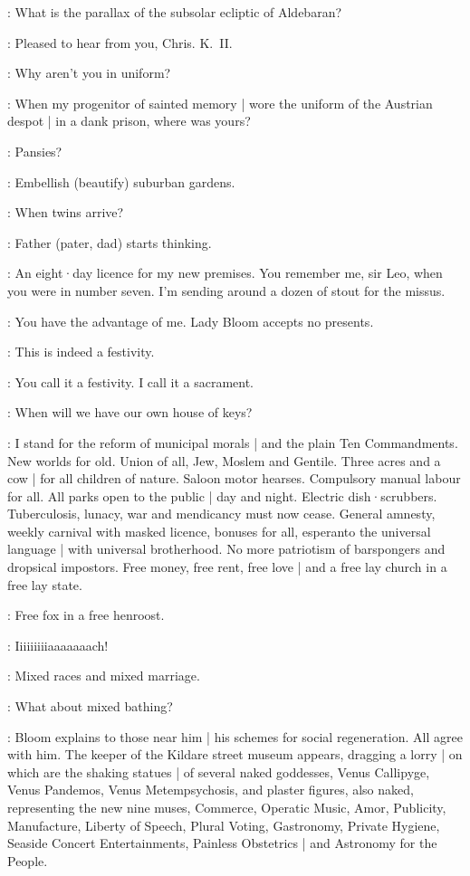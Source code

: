 
\ChrisCallinan[1]:
What is the parallax of the subsolar ecliptic of Aldebaran?

\Bloom:
Pleased to hear from you,
Chris.
K.~II.

\JoeHynes[2]:
Why aren't you in uniform?%

\Bloom:
When my progenitor of sainted memory |
wore the uniform of the Austrian despot |
in a dank prison,
where was yours?

\BenDollard[1]:
Pansies?

\Bloom:
Embellish (beautify) suburban gardens.

\BenDollard:
When twins arrive?

\Bloom:
Father (pater, dad) starts thinking.

\LarryORourke[2]:
An eight·day licence for my new premises.
You remember me,
sir Leo,
when you were in number seven.
I'm sending around a dozen of stout for the missus.

\Bloom:
You have the advantage of me.
Lady Bloom accepts no presents.

\Crofton[1]:
This is indeed a festivity.

\Bloom:
You call it a festivity.
I call it a sacrament.

\AlexanderKeyes[2]:
When will we have our own house of keys?

\Bloom:
I stand for the reform of municipal morals |
and the plain Ten Commandments.
New worlds for old.
Union of all,
Jew,
Moslem and Gentile.
Three acres and a cow |
for all children of nature.
Saloon motor hearses.
Compulsory manual labour for all.
All parks open to the public |
day and night.
Electric dish·scrubbers.
Tuberculosis,
lunacy,
war and mendicancy must now cease.
General amnesty,
weekly carnival with masked licence,
bonuses for all,
esperanto the universal language |
with universal brotherhood.
No more patriotism of barspongers and dropsical impostors.
Free money,
free rent,
free love |
and a free lay church in a free lay state.

\OMaddenBurke[1]:
Free fox in a free henroost.

\DavyByrne[2]:
Iiiiiiiiiaaaaaaach!

\Bloom:
Mixed races and mixed marriage.

\Lenehan[1]:
What about mixed bathing?

:
Bloom explains to those near him |
his schemes for social regeneration.
All agree with him.
The keeper of the Kildare street museum appears,
dragging a lorry |
on which are the shaking statues |
of several naked goddesses,
Venus Callipyge,
Venus Pandemos,
Venus Metempsychosis,
and plaster figures,
also naked,
representing the new nine muses,
Commerce,
Operatic Music,
Amor,
Publicity,
Manufacture,
Liberty of Speech,
Plural Voting,
Gastronomy,
Private Hygiene,
Seaside Concert Entertainments,
Painless Obstetrics |
and Astronomy for the People.

